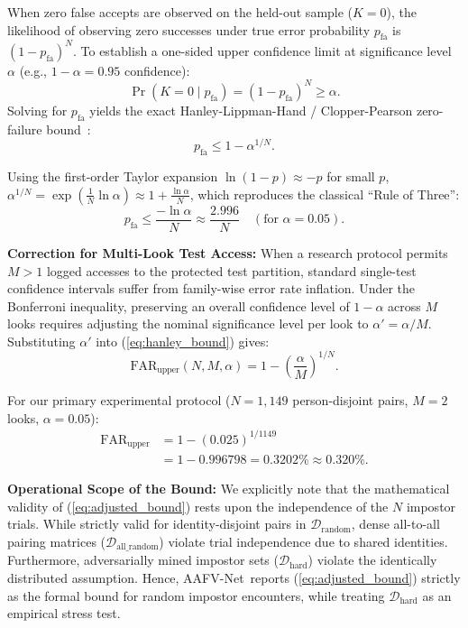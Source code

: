 \documentclass[10pt,journal,compsoc]{IEEEtran}
\newcommand{\sys}{AAFV-Net}
\begin{document}
When zero false accepts are observed on the held-out sample ($K = 0$), the likelihood of observing zero successes under true error probability $p_{\text{fa}}$ is $(1 - p_{\text{fa}})^N$. To establish a one-sided upper confidence limit at significance level $\alpha$ (e.g., $1 - \alpha = 0.95$ confidence):
\begin{equation}
\Pr(K = 0 \mid p_{\text{fa}}) = (1 - p_{\text{fa}})^N \ge \alpha.
\end{equation}
Solving for $p_{\text{fa}}$ yields the exact Hanley-Lippman-Hand / Clopper-Pearson zero-failure bound~\cite{hanley1983rule3,clopper1934}:
\begin{equation}
\label{eq:hanley_bound}
p_{\text{fa}} \le 1 - \alpha^{1/N}.
\end{equation}

Using the first-order Taylor expansion $\ln(1 - p) \approx -p$ for small $p$, $\alpha^{1/N} = \exp(\frac{1}{N} \ln \alpha) \approx 1 + \frac{\ln \alpha}{N}$, which reproduces the classical ``Rule of Three'':
\begin{equation}
p_{\text{fa}} \le \frac{-\ln \alpha}{N} \approx \frac{2.996}{N} \quad (\text{for } \alpha = 0.05).
\end{equation}

\textbf{Correction for Multi-Look Test Access:}
When a research protocol permits $M > 1$ logged accesses to the protected test partition, standard single-test confidence intervals suffer from family-wise error rate inflation. Under the Bonferroni inequality, preserving an overall confidence level of $1 - \alpha$ across $M$ looks requires adjusting the nominal significance level per look to $\alpha' = \alpha / M$. Substituting $\alpha'$ into (\ref{eq:hanley_bound}) gives:
\begin{equation}
\label{eq:adjusted_bound}
\text{FAR}_{\text{upper}}(N, M, \alpha) = 1 - \left(\frac{\alpha}{M}\right)^{1/N}.
\end{equation}

For our primary experimental protocol ($N = 1{,}149$ person-disjoint pairs, $M = 2$ looks, $\alpha = 0.05$):
\begin{align}
\text{FAR}_{\text{upper}} &= 1 - (0.025)^{1/1149} \nonumber \\
&= 1 - 0.996798 = 0.3202\% \approx 0.320\%.
\end{align}

\textbf{Operational Scope of the Bound:}
We explicitly note that the mathematical validity of (\ref{eq:adjusted_bound}) rests upon the independence of the $N$ impostor trials. While strictly valid for identity-disjoint pairs in $\mathcal{D}_{\text{random}}$, dense all-to-all pairing matrices ($\mathcal{D}_{\text{all\_random}}$) violate trial independence due to shared identities. Furthermore, adversarially mined impostor sets ($\mathcal{D}_{\text{hard}}$) violate the identically distributed assumption. Hence, \sys\ reports (\ref{eq:adjusted_bound}) strictly as the formal bound for random impostor encounters, while treating $\mathcal{D}_{\text{hard}}$ as an empirical stress test.
\end{document}
